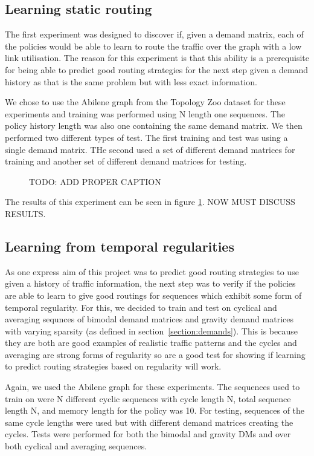 \subsection{Learning static routing}
The first experiment was designed to discover if, given a demand matrix, each of the policies would be able to learn to route the traffic over the graph with a low link utilisation. The reason for this experiment is that this ability is a prerequisite for being able to predict good routing strategies for the next step given a demand history as that is the same problem but with less exact information.

We chose to use the Abilene graph from the Topology Zoo dataset for these experiments and training was performed using N length one sequences. The policy history length was also one containing the same demand matrix. We then performed two different types of test. The first training and test was using a single demand matrix. THe second used a set of different demand matrices for training and another set of different demand matrices for testing.

\begin{figure}
    \centering
    
    \caption{TODO: ADD PROPER CAPTION}
    \label{fig:exp_static}
\end{figure}

The results of this experiment can be seen in figure \ref{fig:exp_static}. NOW MUST DISCUSS RESULTS.


\subsection{Learning from temporal regularities}
As one express aim of this project was to predict good routing strategies to use given a history of traffic information, the next step was to verify if the policies are able to learn to give good routings for sequences which exhibit some form of temporal regularity. For this, we decided to train and test on cyclical and averaging sequnces of bimodal demand matrices and gravity demand matrices with varying sparsity (as defined in section~\ref{section:demands}). This is because they are both are good examples of realistic traffic patterns and the cycles and averaging are strong forms of regularity so are a good test for showing if learning to predict routing strategies based on regularity will work.

Again, we used the Abilene graph for these experiments. The sequences used to train on were N different cyclic sequences with cycle length N, total sequence length N, and memory length for the policy was 10. For testing, sequences of the same cycle lengths were used but with different demand matrices creating the cycles. Tests were performed for both the bimodal and gravity DMs and over both cyclical and averaging sequences.

